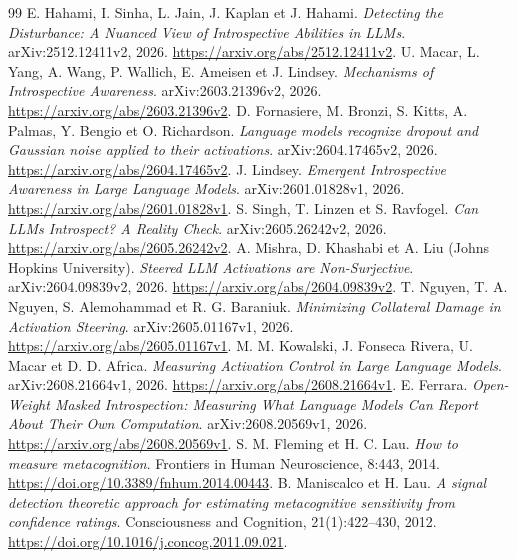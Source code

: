 \documentclass[10pt,a4paper]{article}
\begin{document}
\clearpage
\begin{thebibliography}{99}
 E. Hahami, I. Sinha, L. Jain, J. Kaplan et J. Hahami. \emph{Detecting the Disturbance: A Nuanced View of Introspective Abilities in LLMs}. arXiv:2512.12411v2, 2026. \url{https://arxiv.org/abs/2512.12411v2}.
 U. Macar, L. Yang, A. Wang, P. Wallich, E. Ameisen et J. Lindsey. \emph{Mechanisms of Introspective Awareness}. arXiv:2603.21396v2, 2026. \url{https://arxiv.org/abs/2603.21396v2}.
 D. Fornasiere, M. Bronzi, S. Kitts, A. Palmas, Y. Bengio et O. Richardson. \emph{Language models recognize dropout and Gaussian noise applied to their activations}. arXiv:2604.17465v2, 2026. \url{https://arxiv.org/abs/2604.17465v2}.
 J. Lindsey. \emph{Emergent Introspective Awareness in Large Language Models}. arXiv:2601.01828v1, 2026. \url{https://arxiv.org/abs/2601.01828v1}.
 S. Singh, T. Linzen et S. Ravfogel. \emph{Can LLMs Introspect? A Reality Check}. arXiv:2605.26242v2, 2026. \url{https://arxiv.org/abs/2605.26242v2}.
 A. Mishra, D. Khashabi et A. Liu (Johns Hopkins University). \emph{Steered LLM Activations are Non-Surjective}. arXiv:2604.09839v2, 2026. \url{https://arxiv.org/abs/2604.09839v2}.
 T. Nguyen, T. A. Nguyen, S. Alemohammad et R. G. Baraniuk. \emph{Minimizing Collateral Damage in Activation Steering}. arXiv:2605.01167v1, 2026. \url{https://arxiv.org/abs/2605.01167v1}.
 M. M. Kowalski, J. Fonseca Rivera, U. Macar et D. D. Africa. \emph{Measuring Activation Control in Large Language Models}. arXiv:2608.21664v1, 2026. \url{https://arxiv.org/abs/2608.21664v1}.
 E. Ferrara. \emph{Open-Weight Masked Introspection: Measuring What Language Models Can Report About Their Own Computation}. arXiv:2608.20569v1, 2026. \url{https://arxiv.org/abs/2608.20569v1}.
 S. M. Fleming et H. C. Lau. \emph{How to measure metacognition}. Frontiers in Human Neuroscience, 8:443, 2014. \url{https://doi.org/10.3389/fnhum.2014.00443}.
 B. Maniscalco et H. Lau. \emph{A signal detection theoretic approach for estimating metacognitive sensitivity from confidence ratings}. Consciousness and Cognition, 21(1):422--430, 2012. \url{https://doi.org/10.1016/j.concog.2011.09.021}.
\end{thebibliography}
\end{document}
